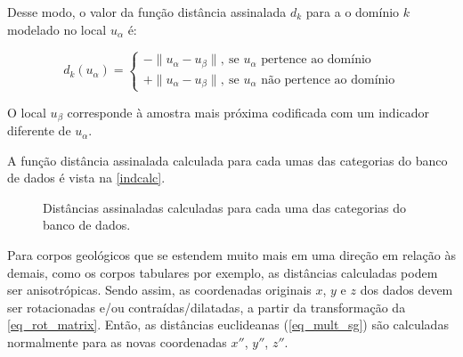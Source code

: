 Desse modo, o valor da função distância assinalada $d_k$ para a o domínio $k$ modelado no local $u_\alpha$ é:

\begin{equation}
	d_k(u_\alpha)=\begin{cases}
	-\parallel u_\alpha-u_\beta\parallel,\:\textrm{se $u_\alpha$ pertence ao domínio}\\
	+\parallel u_\alpha-u_\beta\parallel,\:\textrm{se $u_\alpha$ não pertence ao domínio}\end{cases}
    \label{eq_mult_sg}
\end{equation}

O local $u_\beta$ corresponde à amostra mais próxima codificada com um indicador diferente de $u_\alpha$.

A função distância assinalada calculada para cada umas das categorias do banco de dados é vista na \autoref{indcalc}.

\begin{figure}
    \caption{Distâncias assinaladas calculadas para cada uma das categorias do banco de dados.} \label{indcalc}
     \centering
\end{figure}

Para corpos geológicos que se estendem muito mais em uma direção em relação às demais, como os corpos tabulares por exemplo, as distâncias calculadas podem ser anisotrópicas. Sendo assim, as coordenadas originais $x$, $y$ e $z$ dos dados devem ser rotacionadas e/ou contraídas/dilatadas, a partir da transformação da \autoref{eq_rot_matrix}. Então, as distâncias euclideanas (\autoref{eq_mult_sg}) são calculadas normalmente para as novas coordenadas $x''$, $y''$, $z''$.

